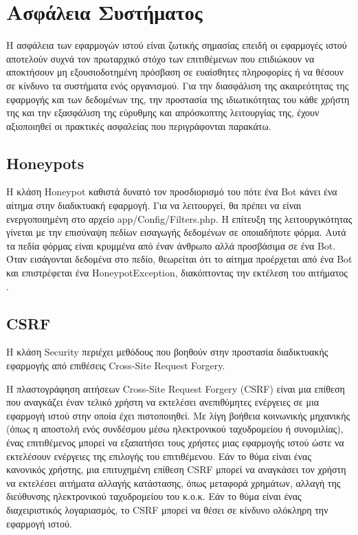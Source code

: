 \FloatBarrier
\section{Ασφάλεια Συστήματος}
Η ασφάλεια των εφαρμογών ιστού είναι ζωτικής σημασίας επειδή οι εφαρμογές ιστού αποτελούν συχνά τον πρωταρχικό στόχο των επιτιθέμενων που επιδιώκουν να αποκτήσουν μη εξουσιοδοτημένη πρόσβαση σε ευαίσθητες πληροφορίες ή να θέσουν σε κίνδυνο τα συστήματα ενός οργανισμού. Για την διασφάλιση της ακαιρεότητας της εφαρμογής και των δεδομένων της, την προστασία της ιδιωτικότητας του κάθε χρήστη της και την εξασφάλιση της εύρυθμης και απρόσκοπτης λειτουργίας της, έχουν αξιοποιηθεί οι πρακτικές ασφαλείας που περιγράφονται παρακάτω.

\subsection{Honeypots}
Η κλάση Honeypot καθιστά δυνατό τον προσδιορισμό του πότε ένα Bot κάνει ένα αίτημα στην διαδικτυακή εφαρμογή. Για να λειτουργεί, θα πρέπει να είναι ενεργοποιημένη στο αρχείο app/Config/Filters.php. Η επίτευξη της λειτουργικότητας γίνεται με την επισύναψη πεδίων εισαγωγής δεδομένων σε οποιαδήποτε φόρμα. Αυτά τα πεδία φόρμας είναι κρυμμένα από έναν άνθρωπο αλλά προσβάσιμα σε ένα Bot. Όταν εισάγονται δεδομένα στο πεδίο, θεωρείται ότι το αίτημα προέρχεται από ένα Bot και επιστρέφεται ένα HoneypotException, διακόπτοντας την εκτέλεση του αιτήματος \cite{CodeIgniter_honeypots}.

\subsection{CSRF}
Η κλάση Security περιέχει μεθόδους που βοηθούν στην προστασία διαδικτυακής εφαρμογής από επιθέσεις Cross-Site Request Forgery.

Η πλαστογράφηση αιτήσεων Cross-Site Request Forgery (CSRF) είναι μια επίθεση που αναγκάζει έναν τελικό χρήστη να εκτελέσει ανεπιθύμητες ενέργειες σε μια εφαρμογή ιστού στην οποία έχει πιστοποιηθεί. Με λίγη βοήθεια κοινωνικής μηχανικής (όπως η αποστολή ενός συνδέσμου μέσω ηλεκτρονικού ταχυδρομείου ή συνομιλίας), ένας επιτιθέμενος μπορεί να εξαπατήσει τους χρήστες μιας εφαρμογής ιστού ώστε να εκτελέσουν ενέργειες της επιλογής του επιτιθέμενου. Εάν το θύμα είναι ένας κανονικός χρήστης, μια επιτυχημένη επίθεση CSRF μπορεί να αναγκάσει τον χρήστη να εκτελέσει αιτήματα αλλαγής κατάστασης, όπως μεταφορά χρημάτων, αλλαγή της διεύθυνσης ηλεκτρονικού ταχυδρομείου του κ.ο.κ. Εάν το θύμα είναι ένας διαχειριστικός λογαριασμός, το CSRF μπορεί να θέσει σε κίνδυνο ολόκληρη την εφαρμογή ιστού.

